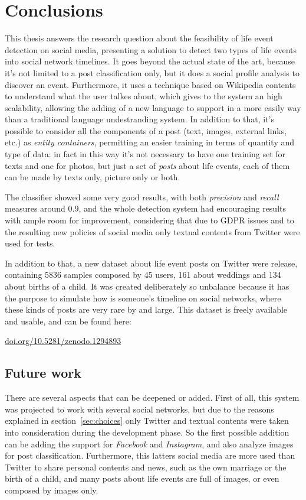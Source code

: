 \chapter{Conclusions}
\label{cha:conclusions}
This thesis answers the research question about the feasibility of life event detection on social media, presenting a solution to detect two types of life events into social network timelines. It goes beyond the actual state of the art, because it's not limited to a post classification only, but it does a social profile analysis to discover an event. Furthermore, it uses a technique based on Wikipedia contents to understand what the user talkes about, which gives to the system an high scalability, allowing the adding of a new language to support in a more easily way than a traditional language undestranding system. In addition to that, it's possible to consider all the components of a post (text, images, external links, etc.) as \emph{entity containers}, permitting an easier training in terms of quantity and type of data: in fact in this way it's not necessary to have one training set for texts and one for photos, but just a set of \emph{posts} about life events, each of them can be made by texts only, picture only or both.

The classifier showed some very good results, with both \emph{precision} and \emph{recall} measures around $0.9$, and the whole detection system had encouraging results with ample room for improvement, considering that due to GDPR issues and to the resulting new policies of social media only textual contents from Twitter were used for tests.

In addition to that, a new dataset about life event posts on Twitter were release, containing 5836 samples composed by 45 users, 161 about weddings and 134 about births of a child. It was created deliberately so unbalance because it has the purpose to simulate how is someone's timeline on social networks, where these kinds of posts are very rare by and large. This dataset is freely available and usable, and can be found here:
\begin{center}
\url{doi.org/10.5281/zenodo.1294893}
\end{center}

\section{Future work}
\label{sec:futurework}
There are several aspects that can be deepened or added. First of all, this system was projected to work with several social networks, but due to the reasons explained in section~\ref{sec:choices} only Twitter and textual contents were taken into consideration during the development phase. So the first possible addition can be adding the support for \emph{Facebook} and \emph{Instagram}, and also analyze images for post classification. Furthermore, this latters social media are more used than Twitter to share personal contents and news, such as the own marriage or the birth of a child, and many posts about life events are full of images, or even composed by images only.

